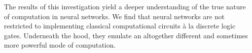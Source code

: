 \documentclass[prx,nofootinbib,onecolumn,showkeys,groupaddress,preprintnumbers,floatfix,
superscriptaddress]{revtex4-1}
\begin{document}



The results of this investigation yield
a deeper understanding of the true nature of computation in neural networks.
We find
that neural networks are not restricted to implementing classical computational circuits \`a la discrete logic gates.  Underneath the hood, they emulate an altogether different and sometimes more powerful mode of computation. 
\end{document}
